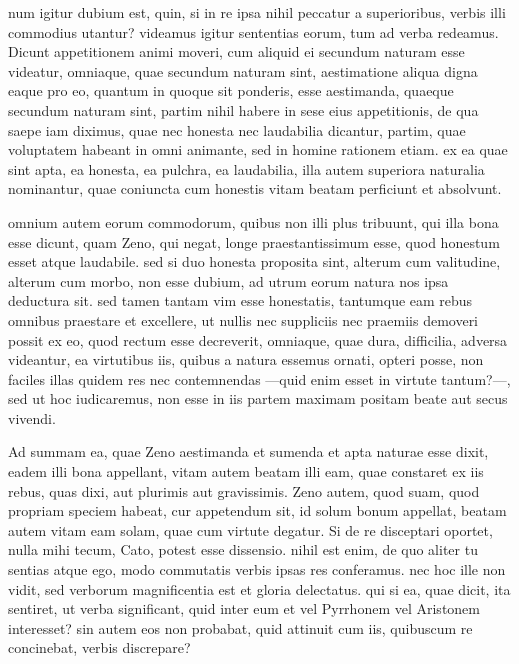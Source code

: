  num igitur dubium est, quin, si in re ipsa nihil peccatur a superioribus, verbis illi commodius utantur? videamus igitur sententias eorum, tum ad verba redeamus. Dicunt appetitionem animi moveri, cum aliquid ei secundum naturam esse videatur, omniaque, quae secundum naturam sint, aestimatione aliqua digna eaque pro eo, quantum in quoque sit ponderis, esse aestimanda, quaeque secundum naturam sint, partim nihil habere in sese eius appetitionis, de qua saepe iam diximus, quae nec honesta nec laudabilia dicantur, partim, quae voluptatem habeant in omni animante, sed in homine rationem etiam. ex ea quae sint apta, ea honesta, ea pulchra, ea laudabilia, illa autem superiora naturalia nominantur, quae coniuncta cum honestis vitam beatam perficiunt et absolvunt.

 omnium autem eorum commodorum, quibus non illi plus tribuunt, qui illa bona esse dicunt, quam Zeno, qui negat, longe praestantissimum esse, quod honestum esset atque laudabile. sed si duo honesta proposita sint, alterum cum valitudine, alterum cum morbo, non esse dubium, ad utrum eorum natura nos ipsa deductura sit. sed tamen tantam vim esse honestatis, tantumque eam rebus omnibus praestare et excellere, ut nullis nec suppliciis nec praemiis demoveri possit ex eo, quod rectum esse decreverit, omniaque, quae dura, difficilia, adversa videantur, ea virtutibus iis, quibus a natura essemus ornati, opteri posse, non faciles illas quidem res nec contemnendas —quid enim esset in virtute tantum?—, sed ut hoc iudicaremus, non esse in iis partem maximam positam beate aut secus vivendi.

 Ad summam ea, quae Zeno aestimanda et sumenda et apta naturae esse dixit, eadem illi bona appellant, vitam autem beatam illi eam, quae constaret ex iis rebus, quas dixi, aut plurimis aut gravissimis. Zeno autem, quod suam, quod propriam speciem habeat, cur appetendum sit, id solum bonum appellat, beatam autem vitam eam solam, quae cum virtute degatur. Si de re disceptari oportet, nulla mihi tecum, Cato, potest esse dissensio. nihil est enim, de quo aliter tu sentias atque ego, modo commutatis verbis ipsas res conferamus. nec hoc ille non vidit, sed verborum magnificentia est et gloria delectatus. qui si ea, quae dicit, ita sentiret, ut verba significant, quid inter eum et vel Pyrrhonem vel Aristonem interesset? sin autem eos non probabat, quid attinuit cum iis, quibuscum re concinebat, verbis discrepare?

